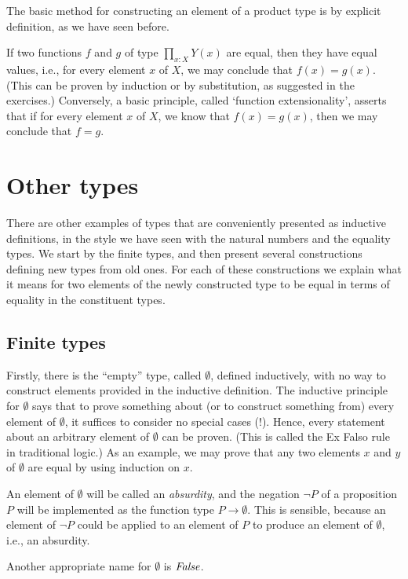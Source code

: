The basic method for constructing an element of a product type
is by explicit definition, as we have seen before.

If two functions $f$ and $g$ of type $\prod_{x:X} Y(x)$ are equal, 
then they have equal values, i.e., for every element $x$ of $X$, 
we may conclude that $f(x) = g(x)$.
(This can be proven by induction or by substitution, as suggested in the exercises.)
Conversely, a basic principle, called `function extensionality', 
asserts that if for every element $x$ of $X$, 
we know that $f(x) = g(x)$, then we may conclude that $f=g$.

\section{Other types}
\label{sec:other-types}

There are other examples of types that are conveniently presented as 
inductive definitions, in the style we have seen with the natural numbers
and the equality types.  We start by the finite types, and then
present several constructions defining new types from old ones.
For each of these constructions we explain what it means for two 
elements of the newly constructed type to be equal in terms of
equality in the constituent types.

\subsection{Finite types}
\label{sec:finite-types}
Firstly, there is the ``empty'' type, called $\emptyset$, defined inductively, with no way to construct elements provided in the inductive
definition.  The inductive principle for $\emptyset$ says that to prove something about (or to construct something from) every element of
$\emptyset$, it suffices to consider no special cases (!).  Hence, every statement about an arbitrary element of $\emptyset$ can be proven. (This is called the Ex Falso
rule in traditional logic.) As
an example, we may prove that any two elements $x$ and $y$ of $\emptyset$ are equal by using induction on $x$.

An element of $\emptyset$ will be called an \emph{absurdity}, and the negation $\neg P$ of a proposition $P$ will be implemented as the function
type $P \to \emptyset$.  This is sensible, because an element of $\neg P$ could be applied to an element of $P$ to produce an element of
$\emptyset$, i.e., an absurdity.

Another appropriate name for $\emptyset$ is $\mathop{\mathit{False}}$.

